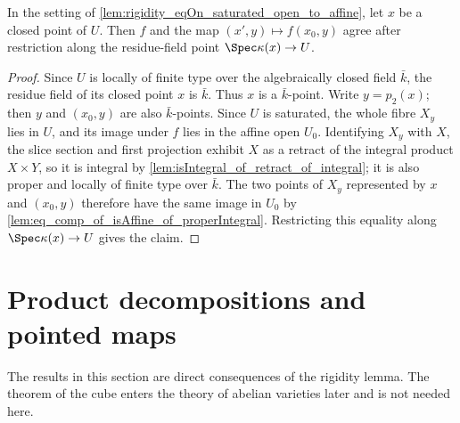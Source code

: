 \begin{lemma}
  \label{lem:rigidity_eqAt_closedPoint_of_proper_into_affine}
  \leanok
  In the setting of
  \cref{lem:rigidity_eqOn_saturated_open_to_affine}, let \(x\) be a closed point of
  \(U\).  Then \(f\) and the map \((x',y)\mapsto f(x_0,y)\) agree after restriction
  along the residue-field point \(\Spec\kappa(x)\to U\).
\end{lemma}
\begin{proof}
  \leanok
  Since \(U\) is locally of finite type over the algebraically closed field \(\bar k\),
  the residue field of its closed point \(x\) is \(\bar k\).  Thus \(x\) is a
  \(\bar k\)-point.  Write \(y=p_2(x)\); then \(y\) and \((x_0,y)\) are also
  \(\bar k\)-points.  Since \(U\) is saturated, the whole fibre \(X_y\) lies in
  \(U\), and its image under \(f\) lies in the affine open \(U_0\).  Identifying
  \(X_y\) with \(X\), the slice section and first projection exhibit \(X\) as a
  retract of the integral product \(X\times Y\), so it is integral by
  \cref{lem:isIntegral_of_retract_of_integral}; it is also proper and locally of
  finite type over \(\bar k\).  The two points of \(X_y\) represented by \(x\) and
  \((x_0,y)\) therefore have the same image in \(U_0\) by
  \cref{lem:eq_comp_of_isAffine_of_properIntegral}.  Restricting this equality along
  \(\Spec\kappa(x)\to U\) gives the claim.
\end{proof}

\section{Product decompositions and pointed maps}

\begin{remark}
  \label{rmk:cube_not_needed}
  The results in this section are direct consequences of the rigidity lemma.  The theorem
  of the cube enters the theory of abelian varieties later and is not needed here.
\end{remark}

